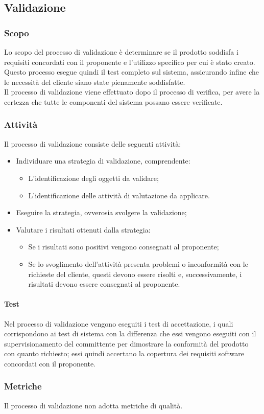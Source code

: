 \documentclass[../norme-di-progetto.tex]{subfiles}
\begin{document}
\subsection{Validazione}
\subsubsection{Scopo}
Lo scopo del processo di validazione è determinare se il prodotto soddisfa i requisiti concordati con il proponente e l'utilizzo specifico per cui è stato creato. Questo processo esegue quindi il test completo sul sistema, assicurando infine che le necessità del cliente siano state pienamente soddisfatte. \\ Il processo di validazione viene effettuato dopo il processo di verifica, per avere la certezza che tutte le componenti del sistema possano essere verificate.
\subsubsection{Attività}
Il processo di validazione consiste delle seguenti attività:
\begin{itemize}
  \item Individuare una strategia di validazione, comprendente:
  \begin{itemize}
    \item L'identificazione degli oggetti da validare;
    \item L'identificazione delle attività di valutazione da applicare.
  \end{itemize}
  \item Eseguire la strategia, ovverosia svolgere la validazione;
  \item Valutare i risultati ottenuti dalla strategia:
  \begin{itemize}
    \item Se i risultati sono positivi vengono consegnati al proponente;
    \item Se lo svoglimento dell'attività presenta problemi o inconformità con le richieste del cliente, questi devono essere risolti e, successivamente, i risultati devono essere consegnati al proponente.
  \end{itemize}
\end{itemize}
\paragraph{Test}
Nel processo di validazione vengono eseguiti i test di accettazione, i quali corrispondono ai test di sistema con la differenza che essi vengono eseguiti con il supervisionamento del committente per dimostrare la conformità del prodotto con quanto richiesto; essi quindi accertano la copertura dei requisiti software concordati con il proponente.

\subsubsection{Metriche}
Il processo di validazione non adotta metriche di qualità.
\end{document}
